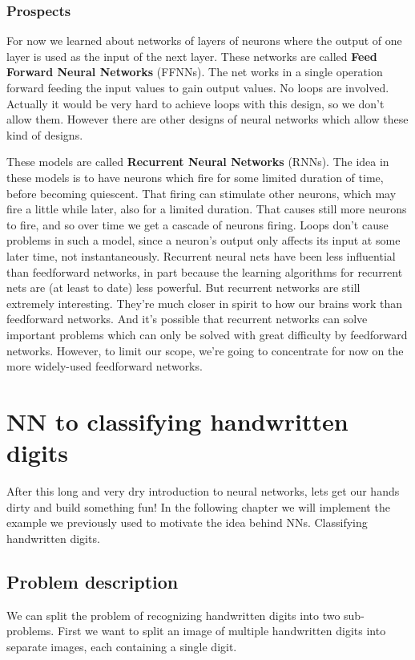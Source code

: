 \documentclass[10pt]{book}
\begin{document}
    \subsection{Prospects}
    For now we learned about networks of layers of neurons where the output of one layer is used as the input of the next layer.
    These networks are called \textbf{Feed Forward Neural Networks} (FFNNs). The net works in a single operation forward feeding the input
    values to gain output values. No loops are involved. Actually it would be very hard to achieve loops with this design, so we don't allow them.
    However there are other designs of neural networks which allow these kind of designs.

    These models are called \textbf{Recurrent Neural Networks} (RNNs).
    The idea in these models is to have neurons which fire for some limited duration of time, before becoming quiescent. That firing can stimulate other neurons, which may fire a little while later, also for a limited duration. That causes still more neurons to fire, and so over time we get a cascade of neurons firing. Loops don't cause problems in such a model, since a neuron's output only affects its input at some later time, not instantaneously.
    Recurrent neural nets have been less influential than feedforward networks, in part because the learning algorithms for recurrent nets are (at least to date) less powerful. But recurrent networks are still extremely interesting. They're much closer in spirit to how our brains work than feedforward networks. And it's possible that recurrent networks can solve important problems which can only be solved with great difficulty by feedforward networks.
    However, to limit our scope, we're going to concentrate for now on the more widely-used feedforward networks.

    \chapter{NN to classifying handwritten digits}
    After this long and very dry introduction to neural networks, lets get our hands dirty and build something fun!
    In the following chapter we will implement the example we previously used to motivate the idea behind NNs. Classifying 
    handwritten digits.
    \section{Problem description}
    We can split the problem of recognizing handwritten digits into two sub-problems.
    First we want to split an image of multiple
    handwritten digits into separate images, each containing a single digit.
\end{document}
